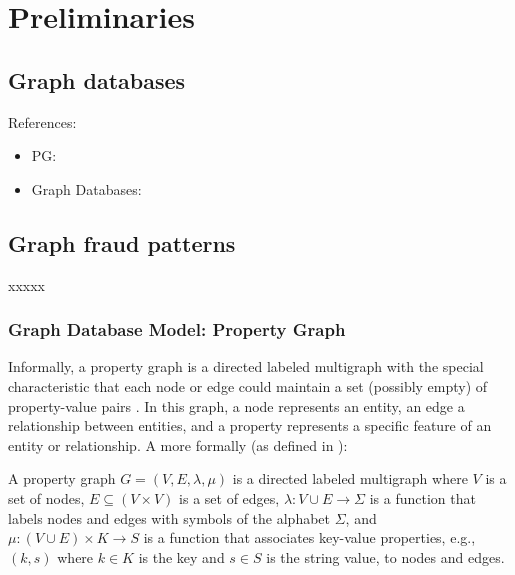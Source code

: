 \section{Preliminaries}
\subsection{Graph databases}

References:
\begin{itemize}
    \item PG: \cite{PG-angles2017foundations, PG-angles2018propertyGraphDatabaseModel, PG-Graphs-at-a-time-GraphQL-QueryLanguage, PG-exampleUsageSimeonovski}
    \item Graph Databases: \textcolor{blue}{\cite{GDB-angles2008survey, GDB-kumar2015graph}}
\end{itemize}
\subsection{Graph fraud patterns}
xxxxx
\subsubsection*{Graph Database Model: Property Graph}

Informally, a property graph is a directed labeled multigraph with the special characteristic that each node or edge could maintain a set (possibly empty) of property-value pairs \cite{angles2018propertyGraphDatabaseModel}. In this graph, a node represents an entity, an edge a relationship between entities, and a property represents a specific feature of an entity or relationship. 
A more formally  (as defined in \cite{PG-exampleUsageSimeonovski}):

\begin{definition}
A property graph $G=(V,E, \lambda, \mu)$ is a directed labeled multigraph where $V$ is a set of nodes, $E \subseteq (V \times V)$ is a set of edges, $\lambda: V \cup E \rightarrow \Sigma$ is a function that labels nodes and edges with symbols of the alphabet $\Sigma$, and $\mu: (V \cup E) \times K \rightarrow S$ is a function that associates key-value properties, e.g., $(k,s)$ where $k \in K$ is the key and $s \in S$ is the string value, to nodes and edges.  
\end{definition}



